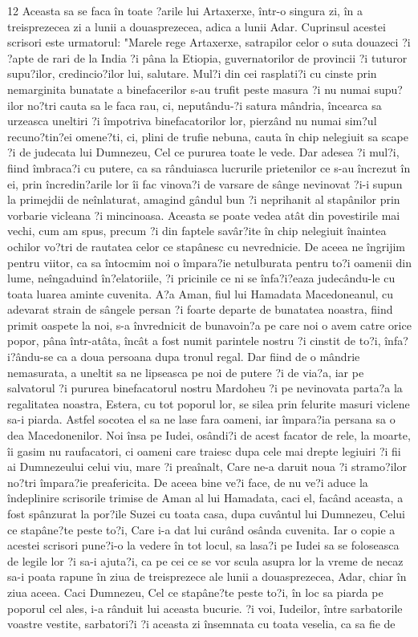 \par 12 Aceasta sa se faca în toate ?arile lui Artaxerxe, într-o singura zi, în a treisprezecea zi a lunii a douasprezecea, adica a lunii Adar. Cuprinsul acestei scrisori este urmatorul: "Marele rege Artaxerxe, satrapilor celor o suta douazeci ?i ?apte de rari de la India ?i pâna la Etiopia, guvernatorilor de provincii ?i tuturor supu?ilor, credincio?ilor lui, salutare. Mul?i din cei rasplati?i cu cinste prin nemarginita bunatate a binefacerilor s-au trufit peste masura ?i nu numai supu?ilor no?tri cauta sa le faca rau, ci, neputându-?i satura mândria, încearca sa urzeasca uneltiri ?i împotriva binefacatorilor lor, pierzând nu numai sim?ul recuno?tin?ei omene?ti, ci, plini de trufie nebuna, cauta în chip nelegiuit sa scape ?i de judecata lui Dumnezeu, Cel ce pururea toate le vede. Dar adesea ?i mul?i, fiind îmbraca?i cu putere, ca sa rânduiasca lucrurile prietenilor ce s-au încrezut în ei, prin încredin?arile lor îi fac vinova?i de varsare de sânge nevinovat ?i-i supun la primejdii de neînlaturat, amagind gândul bun ?i neprihanit al stapânilor prin vorbarie vicleana ?i mincinoasa. Aceasta se poate vedea atât din povestirile mai vechi, cum am spus, precum ?i din faptele savâr?ite în chip nelegiuit înaintea ochilor vo?tri de rautatea celor ce stapânesc cu nevrednicie. De aceea ne îngrijim pentru viitor, ca sa întocmim noi o împara?ie netulburata pentru to?i oamenii din lume, neîngaduind în?elatoriile, ?i pricinile ce ni se înfa?i?eaza judecându-le cu toata luarea aminte cuvenita. A?a Aman, fiul lui Hamadata Macedoneanul, cu adevarat strain de sângele persan ?i foarte departe de bunatatea noastra, fiind primit oaspete la noi, s-a învrednicit de bunavoin?a pe care noi o avem catre orice popor, pâna într-atâta, încât a fost numit parintele nostru ?i cinstit de to?i, înfa?i?ându-se ca a doua persoana dupa tronul regal. Dar fiind de o mândrie nemasurata, a uneltit sa ne lipseasca pe noi de putere ?i de via?a, iar pe salvatorul ?i pururea binefacatorul nostru Mardoheu ?i pe nevinovata parta?a la regalitatea noastra, Estera, cu tot poporul lor, se silea prin felurite masuri viclene sa-i piarda. Astfel socotea el sa ne lase fara oameni, iar împara?ia persana sa o dea Macedonenilor. Noi însa pe Iudei, osândi?i de acest facator de rele, la moarte, îi gasim nu raufacatori, ci oameni care traiesc dupa cele mai drepte legiuiri ?i fii ai Dumnezeului celui viu, mare ?i preaînalt, Care ne-a daruit noua ?i stramo?ilor no?tri împara?ie preafericita. De aceea bine ve?i face, de nu ve?i aduce la îndeplinire scrisorile trimise de Aman al lui Hamadata, caci el, facând aceasta, a fost spânzurat la por?ile Suzei cu toata casa, dupa cuvântul lui Dumnezeu, Celui ce stapâne?te peste to?i, Care i-a dat lui curând osânda cuvenita. Iar o copie a acestei scrisori pune?i-o la vedere în tot locul, sa lasa?i pe Iudei sa se foloseasca de legile lor ?i sa-i ajuta?i, ca pe cei ce se vor scula asupra lor la vreme de necaz sa-i poata rapune în ziua de treisprezece ale lunii a douasprezecea, Adar, chiar în ziua aceea. Caci Dumnezeu, Cel ce stapâne?te peste to?i, în loc sa piarda pe poporul cel ales, i-a rânduit lui aceasta bucurie. ?i voi, Iudeilor, între sarbatorile voastre vestite, sarbatori?i ?i aceasta zi însemnata cu toata veselia, ca sa fie de 